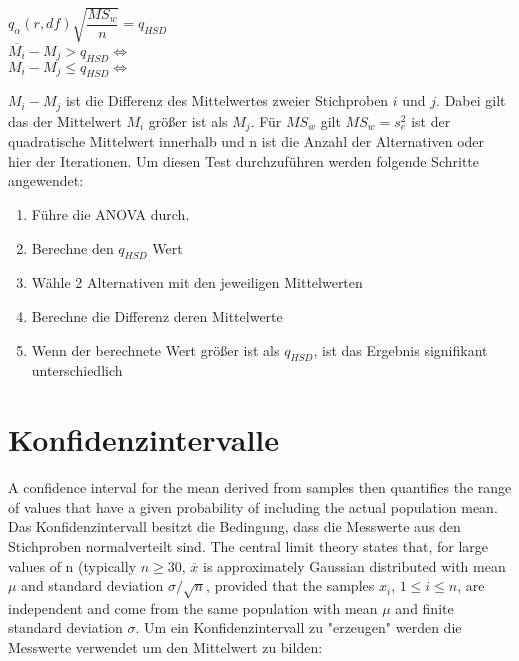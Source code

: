 \begin{center}
  $q_{\alpha}(r, df){\sqrt{\dfrac{MS_w}{n}}} = q_{HSD}$ \\
  $\overline{M_i} - M_j > q_{HSD} \iff$  \\
  $M_i - M_j \leq q_{HSD} \iff$  
\end{center}

$M_i - M_j$ ist die Differenz des Mittelwertes zweier Stichproben $i$ und $j$.
Dabei gilt das der Mittelwert $M_i$ größer ist als $M_j$.
Für $MS_w$ gilt $MS_w = s^2_{e}$ ist der quadratische Mittelwert innerhalb und n ist die Anzahl
der Alternativen oder hier der Iterationen.
Um diesen Test durchzuführen werden folgende Schritte angewendet:

\begin{center}
  \begin{enumerate}
    \item Führe die ANOVA durch. 
    \item Berechne den $q_{HSD}$ Wert
    \item Wähle 2 Alternativen mit den jeweiligen Mittelwerten
    \item Berechne die Differenz deren Mittelwerte
    \item Wenn der berechnete Wert größer ist als $q_{HSD}$, ist das Ergebnis signifikant unterschiedlich 
  \end{enumerate}
\end{center}



\section{Konfidenzintervalle}

A confidence interval for the mean
derived from samples then quantifies the range of values that have a given probability of including the actual population mean.
Das Konfidenzintervall besitzt die Bedingung, dass die Messwerte aus den Stichproben normalverteilt sind.
The central limit theory states that, for large
values of n (typically $n \geq 30$, $\overline{x}$ is approximately Gaussian
distributed with mean $\mu$ and standard deviation $\sigma / \sqrt{n}$, provided that the samples $x_i$, $1 \leq i \leq n$, are independent and
come from the same population with mean $\mu$ and finite
standard deviation $\sigma$.
Um ein Konfidenzintervall zu "erzeugen" werden die Messwerte verwendet um den Mittelwert zu bilden:


